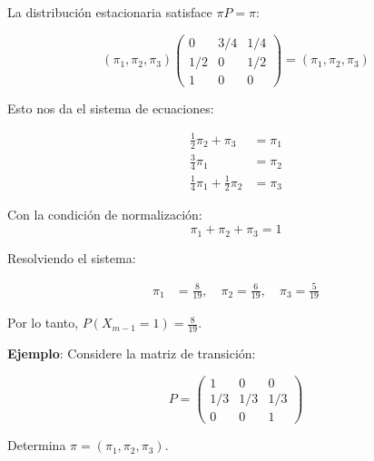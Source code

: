 \documentclass[12pt,a4paper]{article}
\begin{document}
La distribución estacionaria satisface $\pi P = \pi$:

\begin{equation*}
(\pi_1, \pi_2, \pi_3) \begin{pmatrix}
0 & 3/4 & 1/4 \\
1/2 & 0 & 1/2 \\
1 & 0 & 0
\end{pmatrix} = (\pi_1, \pi_2, \pi_3)
\end{equation*}

Esto nos da el sistema de ecuaciones:

\begin{align*}
\frac{1}{2} \pi_2 + \pi_3 &= \pi_1 \\
\frac{3}{4} \pi_1 &= \pi_2 \\
\frac{1}{4} \pi_1 + \frac{1}{2} \pi_2 &= \pi_3
\end{align*}

Con la condición de normalización:
\begin{equation}
\pi_1 + \pi_2 + \pi_3 = 1
\end{equation}

Resolviendo el sistema:

\begin{align*}
\pi_1 &= \frac{8}{19}, \quad \pi_2 = \frac{6}{19}, \quad \pi_3 = \frac{5}{19}
\end{align*}

Por lo tanto, $P(X_{m-1} = 1) = \frac{8}{19}$.

\textbf{Ejemplo}: Considere la matriz de transición:

\begin{equation*}
P = \begin{pmatrix}
1 & 0 & 0 \\
1/3 & 1/3 & 1/3 \\
0 & 0 & 1
\end{pmatrix}
\end{equation*}

Determina $\pi = (\pi_1, \pi_2, \pi_3)$.

\begin{center}
\end{center}
\end{document}
